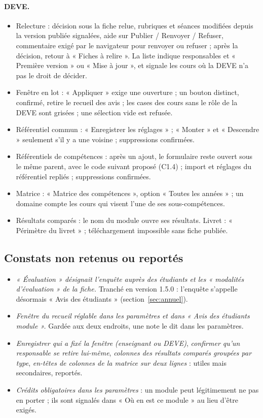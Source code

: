 \documentclass[11pt,a4paper]{article}
\begin{document}
\paragraph{DEVE.}
\begin{itemize}
  \item Relecture : décision sous la fiche relue, rubriques et séances modifiées depuis la
    version publiée signalées, aide sur Publier / Renvoyer / Refuser, commentaire exigé par le
    navigateur pour renvoyer ou refuser ; après la décision, retour à « Fiches à relire ». La
    liste indique responsables et « Première version » ou « Mise à jour », et signale les cours
    où la DEVE n'a pas le droit de décider.
  \item Fenêtre en lot : « Appliquer » exige une ouverture ; un bouton distinct, confirmé,
    retire le recueil des avis ; les cases des cours sans le rôle de la DEVE sont grisées ; une
    sélection vide est refusée.
  \item Référentiel commun : « Enregistrer les réglages » ; « Monter » et « Descendre » seulement
    s'il y a une voisine ; suppressions confirmées.
  \item Référentiels de compétences : après un ajout, le formulaire reste ouvert sous le même
    parent, avec le code suivant proposé (C1.4) ; import et réglages du référentiel repliés ;
    suppressions confirmées.
  \item Matrice : « Matrice des compétences », option « Toutes les années » ; un domaine compte
    les cours qui visent l'une de ses sous-compétences.
  \item Résultats comparés : le nom du module ouvre ses résultats. Livret : « Périmètre du
    livret » ; téléchargement impossible sans fiche publiée.
\end{itemize}

\subsection{Constats non retenus ou reportés}

\begin{itemize}
  \item \emph{« Évaluation » désignait l'enquête auprès des étudiants et les « modalités
    d'évaluation » de la fiche.} Tranché en version 1.5.0 : l'enquête s'appelle désormais
    « Avis des étudiants » (section~\ref{sec:annuel}).
  \item \emph{Fenêtre du recueil réglable dans les paramètres et dans « Avis des étudiants
    module ».} Gardée aux deux endroits, une note le dit dans les paramètres.
  \item \emph{Enregistrer qui a fixé la fenêtre (enseignant ou DEVE)}, \emph{confirmer qu'un
    responsable se retire lui-même}, \emph{colonnes des résultats comparés groupées par type},
    \emph{en-têtes de colonnes de la matrice sur deux lignes} : utiles mais secondaires, reportés.
  \item \emph{Crédits obligatoires dans les paramètres} : un module peut légitimement ne pas en
    porter ; ils sont signalés dans « Où en est ce module » au lieu d'être exigés.
\end{itemize}
\end{document}
